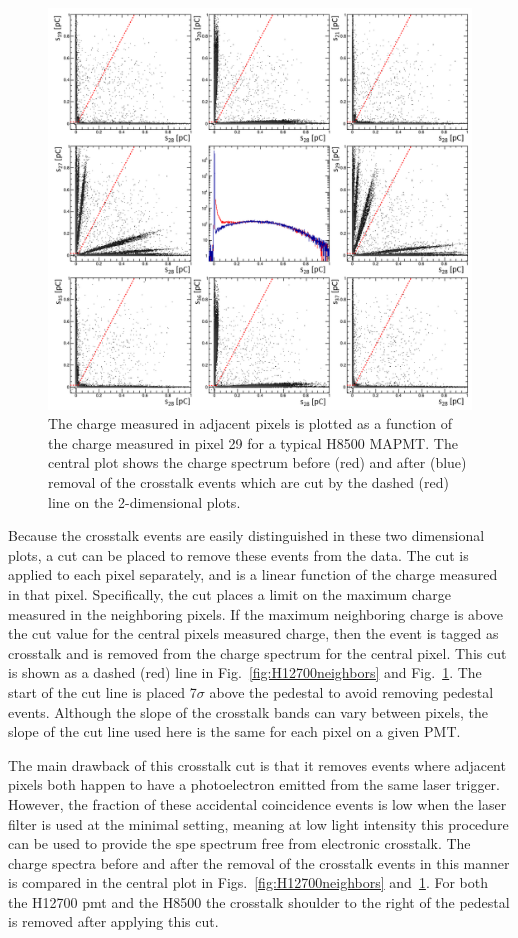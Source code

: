 \begin{figure}[hbt]
	\includegraphics[width=\linewidth]{figures/H8500_ct.png}
	\caption{The charge measured in adjacent pixels is plotted as a function of the charge measured in pixel 29 for a typical H8500 MAPMT. The central plot shows the charge spectrum before (red) and after (blue) removal of the crosstalk events which are cut by the dashed (red) line on the 2-dimensional plots.}
	\label{fig:H8500neighbors}
\end{figure}

Because the crosstalk events are easily distinguished in these two dimensional plots, a cut can be placed to remove these events from the data. The cut is applied to each pixel separately, and is a linear function of the charge measured in that pixel. Specifically, the cut places a limit on the maximum charge measured in the neighboring pixels. If the maximum neighboring charge is above the cut value for the central pixel\textquotesingle s measured charge, then the event is tagged as crosstalk and is removed from the charge spectrum for the central pixel. This cut is shown as a dashed (red) line in Fig.~\ref{fig:H12700neighbors} and Fig.~\ref{fig:H8500neighbors}. The start of the cut line is placed 7$\sigma$ above the pedestal to avoid removing pedestal events. Although the slope of the crosstalk bands can vary between pixels, the slope of the cut line used here is the same for each pixel on a given PMT. 

The main drawback of this crosstalk cut is that it removes events where adjacent pixels both happen to have a photoelectron emitted from the same laser trigger. However, the fraction of these accidental coincidence events is low when the laser filter is used at the minimal setting, meaning at low light intensity this procedure can be used to provide the spe spectrum free from electronic crosstalk. The charge spectra before and after the removal of the crosstalk events in this manner is compared in the central plot in Figs.~\ref{fig:H12700neighbors} and~\ref{fig:H8500neighbors}. For both the H12700 pmt and the H8500 the crosstalk shoulder to the right of the pedestal is removed after applying this cut. 
